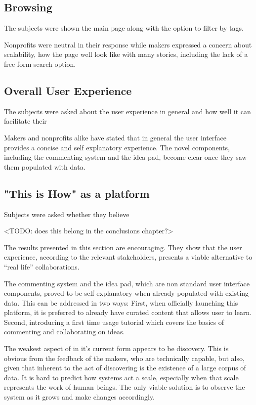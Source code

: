 \subsection{Browsing}

The subjects were shown the main page along with the option to filter by tags.

Nonprofits were neutral in their response while makers expressed a concern about scalability, how the page well look like with many stories, including the lack of a free form search option.

\subsection{Overall User Experience}
The subjects were asked about the user experience in general and how well it can facilitate their  

Makers and nonprofits alike have stated that in general the user interface provides a concise and self explanatory experience. The novel components, including the commenting system and the idea pad, become clear once they saw them populated with data.     

\subsection{"This is How" as a platform}

Subjects were asked whether they believe 


<TODO: does this belong in the conclusions chapter?>

The results presented in this section are encouraging. They show that the user experience, according to the relevant stakeholders, presents a viable alternative to ``real life'' collaborations.

The commenting system and the idea pad, which are non standard user interface components, proved to be self explanatory when already populated with existing data. This can be addressed in two ways: First, when officially launching this platform, it is preferred to already have curated content that allows user to learn. Second, introducing a first time usage tutorial which covers the basics of commenting and collaborating on ideas.

The weakest aspect of \cite{This is How} in it's current form appears to be discovery. This is obvious from the feedback of the makers, who are technically capable, but also, given that inherent to the act of discovering is the existence of a large corpus of data. It is hard to predict how systems act a scale, especially when that scale represents the work of human beings. The only viable solution is to observe the system as it grows and make changes accordingly.